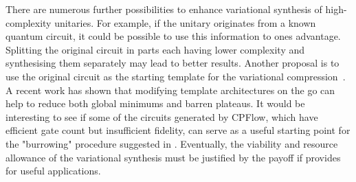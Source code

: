 \documentclass[twocolumn, amsfonts, amssymb, aps, nofootinbib]{revtex4-2}
\begin{document}
There are numerous further possibilities to  enhance variational synthesis of high-complexity unitaries. For example, if the unitary originates from a known quantum circuit, it could be possible to use this information to ones advantage. Splitting the original circuit in parts each having lower complexity and synthesising them separately may lead to better results. Another proposal is to use the original circuit as the starting template for the variational compression~\cite{Rakyta2022}. A recent work \cite{Grimsley2022} has shown that modifying template architectures on the go can help to reduce both global minimums and barren plateaus. It would be interesting to see if some of the circuits generated by CPFlow, which have efficient gate count but insufficient fidelity, can serve as a useful starting point for the "burrowing" procedure suggested in \cite{Grimsley2022}. Eventually, the viability and resource allowance of the variational synthesis must be justified by the payoff if provides for useful applications.
\end{document}
